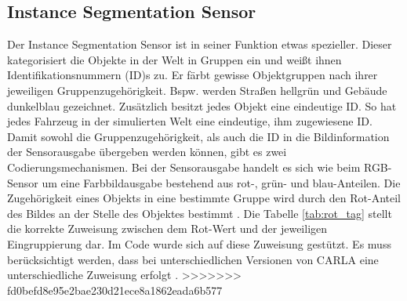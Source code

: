 \subsection{Instance Segmentation Sensor}
Der Instance Segmentation Sensor ist in seiner Funktion etwas spezieller. Dieser kategorisiert die Objekte in der Welt in Gruppen ein und weißt ihnen Identifikationsnummern ({\acs{ID}})s zu. Er färbt gewisse Objektgruppen nach ihrer jeweiligen Gruppenzugehörigkeit. Bspw. werden Straßen hellgrün und Gebäude dunkelblau gezeichnet. Zusätzlich besitzt jedes Objekt eine eindeutige {\ac{ID}}. So hat jedes Fahrzeug in der simulierten Welt eine eindeutige, ihm zugewiesene {\ac{ID}}. Damit sowohl die Gruppenzugehörigkeit, als auch die {\ac{ID}} in die Bildinformation der Sensorausgabe übergeben werden können, gibt es zwei Codierungsmechanismen. Bei der Sensorausgabe handelt es sich wie beim {\ac{RGB}}-Sensor um eine Farbbildausgabe bestehend aus rot-, grün- und blau-Anteilen. Die Zugehörigkeit eines Objekts in eine bestimmte Gruppe wird durch den Rot-Anteil des Bildes an der Stelle des Objektes bestimmt \cite{lit_website_carla_documentation}. Die Tabelle \ref{tab:rot_tag} stellt die korrekte Zuweisung zwischen dem Rot-Wert und der jeweiligen Eingruppierung dar. Im Code wurde sich auf diese Zuweisung gestützt. Es muss berücksichtigt werden, dass bei unterschiedlichen Versionen von CARLA eine unterschiedliche Zuweisung erfolgt \cite{lit_website_carla_documentation}. 
>>>>>>> fd0befd8e95e2bae230d21ece8a1862eada6b577


